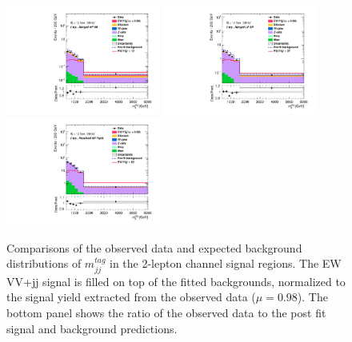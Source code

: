 \begin{figure}[]
    \centering
    \includegraphics[width=0.45\textwidth]{figures/PostFit/Region_distMTagMerJets_DSRVBSHP_BMin0_J0_incJet1_L2_T0_incFat1_Y6051_incTag1_Fat1_GlobalFit_unconditionnal_mu1log.pdf}
    \includegraphics[width=0.45\textwidth]{figures/PostFit/Region_distMTagMerJets_DSRVBSLP_BMin0_J0_incJet1_L2_T0_incFat1_Y6051_incTag1_Fat1_GlobalFit_unconditionnal_mu1log.pdf}
    \includegraphics[width=0.45\textwidth]{figures/PostFit/Region_distMTagResJets_DSRVBSFid_BMin0_T0_Y6051_incTag1_J2_L2_incJet1_GlobalFit_unconditionnal_mu1log.pdf}
    \caption{Comparisons of the observed data and expected background distributions of $m^{tag}_{jj}$ in the 2-lepton channel signal regions. The EW VV+jj signal is filled on top of the fitted backgrounds, normalized to the signal yield extracted from the observed data ($\mu = 0.98$). The bottom panel shows the ratio of the observed data to the post fit signal and background predictions.}
    \label{fig:postSR2lepmtagjj}
\end{figure}

